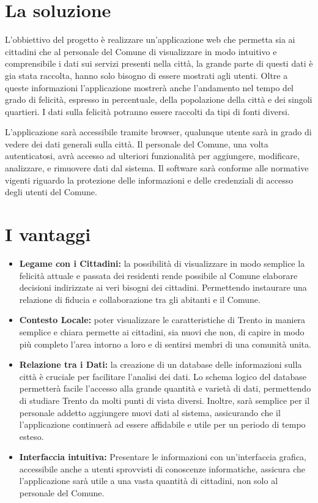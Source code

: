 \section{La soluzione}
    L'obbiettivo del progetto è realizzare un'applicazione web che permetta sia ai cittadini che al personale del Comune di visualizzare in modo intuitivo e comprensibile i dati sui servizi presenti nella città, la grande parte di questi dati è gia stata raccolta, hanno solo bisogno di essere mostrati agli utenti. Oltre a queste informazioni l'applicazione mostrerà anche l'andamento nel tempo del grado di felicità, espresso in percentuale, della popolazione della città e dei singoli quartieri. I dati sulla felicità potranno essere raccolti da tipi di fonti diversi.

    L'applicazione sarà accessibile tramite browser, qualunque utente sarà in grado di vedere dei dati generali sulla città. Il personale del Comune, una volta autenticatosi, avrà accesso ad ulteriori funzionalità per aggiungere, modificare, analizzare, e rimuovere dati dal sistema. Il software sarà conforme alle normative vigenti riguardo la protezione delle informazioni e delle credenziali di accesso degli utenti del Comune.


\section{I vantaggi}
    \begin{itemize}
        \item \textbf{Legame con i Cittadini:} la possibilità di visualizzare in modo semplice la felicità attuale e passata dei residenti rende possibile al Comune elaborare decisioni indirizzate ai veri bisogni dei cittadini. Permettendo instaurare una relazione di fiducia e collaborazione tra gli abitanti e il Comune.
        \item \textbf{Contesto Locale:} poter visualizzare le caratteristiche di Trento in maniera semplice e chiara permette ai cittadini, sia nuovi che non, di capire in modo più completo l'area intorno a loro e di sentirsi membri di una comunità unita.
        \item \textbf{Relazione tra i Dati:} la creazione di un database delle informazioni sulla città è cruciale per facilitare l'analisi dei dati. Lo schema logico del database permetterà facile l'accesso alla grande quantità e varietà di dati, permettendo di studiare Trento da molti punti di vista diversi. Inoltre, sarà semplice per il personale addetto aggiungere nuovi dati al sistema, assicurando che il l'applicazione continuerà ad essere affidabile e utile per un periodo di tempo esteso.
        \item \textbf{Interfaccia intuitiva:} Presentare le informazioni con un'interfaccia grafica, accessibile anche a utenti sprovvisti di conoscenze informatiche, assicura che l'applicazione sarà utile a una vasta quantità di cittadini, non solo al personale del Comune.
    \end{itemize}